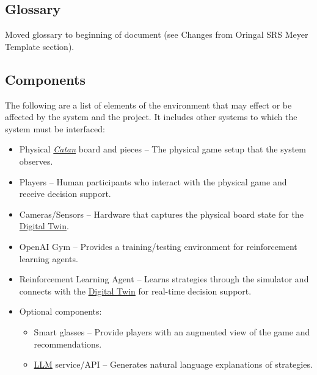 \documentclass{article}
\newcommand{\Catan}{\href{https://en.wikipedia.org/wiki/Catan}{Catan}}
\newcommand{\DigitalTwin}{\href{https://en.wikipedia.org/wiki/Digital_twin}{Digital Twin}}
\newcommand{\LLM}{\href{https://www.cloudflare.com/learning/ai/what-is-large-language-model/}{LLM}}
\begin{document}
\subsection{Glossary}\label{subsec:glossary}
\raggedright Moved glossary to beginning of document (see Changes from Oringal SRS Meyer Template section).

\subsection{Components}\label{subsec:components2}
\raggedright The following are a list of elements of the environment that may effect or be affected by the system and the project. It includes other systems to which the system must be interfaced:
\begin{itemize}
    \item {Physical \emph{\Catan{}} board and pieces} – The physical game setup that the system observes.
    \item {Players} – Human participants who interact with the physical game and receive decision support.
    \item {Cameras/Sensors} – Hardware that captures the physical board state for the \DigitalTwin{}.
    \item {OpenAI Gym} – Provides a training/testing environment for reinforcement learning agents.
    \item {Reinforcement Learning Agent} – Learns strategies through the simulator and connects with the \DigitalTwin{} for real-time decision support.
    \item {Optional components:}
    \begin{itemize}
        \item {Smart glasses} – Provide players with an augmented view of the game and recommendations.
        \item {\LLM{} service/API} – Generates natural language explanations of strategies.
    \end{itemize}
\end{itemize}
\end{document}
